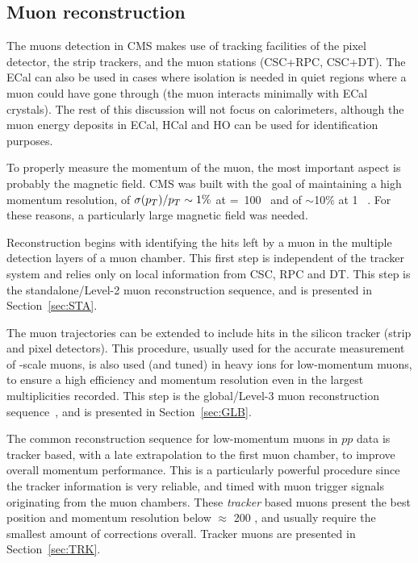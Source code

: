 \subsection{Muon reconstruction}
The muons detection in CMS makes use of tracking facilities of the
pixel detector, the strip trackers, and the muon stations (CSC+RPC,
CSC+DT). The ECal can also be used in cases where isolation is needed
in quiet regions where a muon could have gone through (the muon
interacts minimally with ECal crystals). The rest of this discussion
will not focus on calorimeters, although the muon energy deposits in
ECal, HCal and HO can be used for identification purposes.


To properly measure the momentum of the muon, the most important
aspect is probably the magnetic field. CMS was built with the goal of
maintaining a high momentum resolution, of $\sigma(p_{T})/p_{T} \sim 1\%$
at \pt=~100 \GeVc\ and of $\sim$10\% at 1 \TeVc~\cite{Chatrchyan:2012xi}. For these reasons, a particularly
large magnetic field was needed.  


Reconstruction begins with identifying the hits left by a muon in the multiple
detection layers of a muon chamber. This first step is independent of
the tracker system and relies only on local information from CSC, RPC
and DT. This step is the standalone/Level-2 muon reconstruction
sequence\cite{Bayatian:2006zz}, and is presented in Section~\ref{sec:STA}.

The muon trajectories can be extended to include hits in the silicon
tracker (strip and pixel detectors). This procedure, usually used for
the accurate measurement of \TeV-scale muons, is also used (and tuned) in heavy
ions for low-momentum muons, to ensure a high efficiency and momentum
resolution even in the largest multiplicities recorded. This step is
the global/Level-3 muon reconstruction
sequence~\cite{Bayatian:2006zz}, and is presented in Section~\ref{sec:GLB}.


The common reconstruction sequence for low-momentum muons in $pp$ data
is tracker based, with a late extrapolation to the first muon chamber,
to improve overall momentum performance. This is a particularly
powerful procedure since the tracker information is very reliable, and
timed with muon trigger signals originating from the muon
chambers. These \textit{tracker} based muons present the best position
and momentum resolution below $\approx$ 200 \GeVc, and usually require
the smallest amount of corrections overall. Tracker muons are presented in Section~\ref{sec:TRK}.

